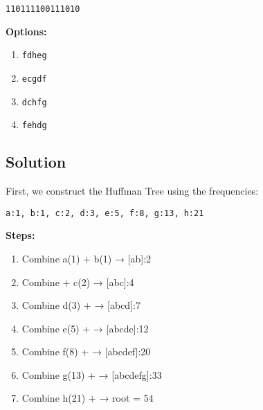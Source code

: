 \documentclass[14pt]{extarticle}
\begin{document}
\begin{center}
\texttt{110111100111010}
\end{center}

\textbf{Options:}
\begin{enumerate}[label=\Alph*.]
    \item \texttt{fdheg}
    \item \texttt{ecgdf}
    \item \texttt{dchfg}
    \item \texttt{fehdg}
\end{enumerate}

\subsection*{Solution}

First, we construct the Huffman Tree using the frequencies:
\begin{center}
\texttt{a:1, b:1, c:2, d:3, e:5, f:8, g:13, h:21}
\end{center}

\textbf{Steps:}
\begin{enumerate}
    \item Combine a(1) + b(1) → [ab]:2
    \item Combine   + c(2) → [abc]:4
    \item Combine d(3) +   → [abcd]:7
    \item Combine e(5) +   → [abcde]:12
    \item Combine f(8) +   → [abcdef]:20
    \item Combine g(13) +   → [abcdefg]:33
    \item Combine h(21) +   → root = 54
\end{enumerate}
\end{document}
